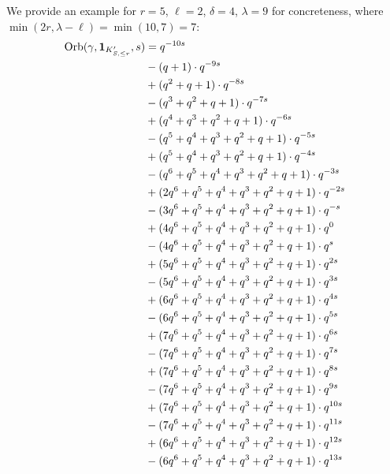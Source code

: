 \begin{example}
  We provide an example for $r=5$, $\ell=2$, $\delta=4$, $\lambda=9$ for concreteness,
  where $\min(2r, \lambda - \ell) = \min(10, 7) = 7$:
  \begin{align*}
    \Orb(\gamma, \mathbf{1}_{K'_{S, \le r}}, s)
    &= q^{-10s} \\
    &- (q + 1) \cdot q^{-9s} \\
    &+ (q^2 + q + 1) \cdot q^{-8s} \\
    &- (q^3 + q^2 + q + 1) \cdot q^{-7s} \\
    &+ (q^4 + q^3 + q^2 + q + 1) \cdot q^{-6s} \\
    &- (q^5 + q^4 + q^3 + q^2 + q + 1) \cdot q^{-5s} \\
    &+ (q^5 + q^4 + q^3 + q^2 + q + 1) \cdot q^{-4s} \\
    &- (q^6 + q^5 + q^4 + q^3 + q^2 + q + 1) \cdot q^{-3s} \\
    &+ (2q^6 + q^5 + q^4 + q^3 + q^2 + q + 1) \cdot q^{-2s} \\
    &- (3q^6 + q^5 + q^4 + q^3 + q^2 + q + 1) \cdot q^{-s} \\
    &+ (4q^6 + q^5 + q^4 + q^3 + q^2 + q + 1) \cdot q^{0} \\
    &- (4q^6 + q^5 + q^4 + q^3 + q^2 + q + 1) \cdot q^{s} \\
    &+ (5q^6 + q^5 + q^4 + q^3 + q^2 + q + 1) \cdot q^{2s} \\
    &- (5q^6 + q^5 + q^4 + q^3 + q^2 + q + 1) \cdot q^{3s} \\
    &+ (6q^6 + q^5 + q^4 + q^3 + q^2 + q + 1) \cdot q^{4s} \\
    &- (6q^6 + q^5 + q^4 + q^3 + q^2 + q + 1) \cdot q^{5s} \\
    &+ (7q^6 + q^5 + q^4 + q^3 + q^2 + q + 1) \cdot q^{6s} \\
    &- (7q^6 + q^5 + q^4 + q^3 + q^2 + q + 1) \cdot q^{7s} \\
    &+ (7q^6 + q^5 + q^4 + q^3 + q^2 + q + 1) \cdot q^{8s} \\
    &- (7q^6 + q^5 + q^4 + q^3 + q^2 + q + 1) \cdot q^{9s} \\
    &+ (7q^6 + q^5 + q^4 + q^3 + q^2 + q + 1) \cdot q^{10s} \\
    &- (7q^6 + q^5 + q^4 + q^3 + q^2 + q + 1) \cdot q^{11s} \\
    &+ (6q^6 + q^5 + q^4 + q^3 + q^2 + q + 1) \cdot q^{12s} \\
    &- (6q^6 + q^5 + q^4 + q^3 + q^2 + q + 1) \cdot q^{13s} \\

\end{align*}
\end{example}
